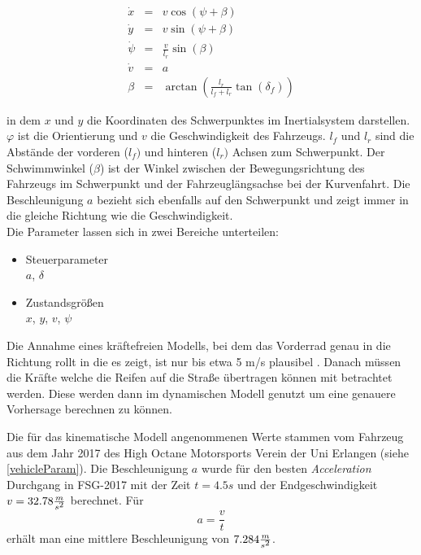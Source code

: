 \documentclass{like}
\begin{document}
\begin{eqnarray}
\label{kinDiscrete}
\dot{x}   &= &v  \cos(\psi + \beta)\\
\dot{y}   &= &v  \sin(\psi + \beta)\\
\dot{\psi} &= &\frac{v}{l_r} \sin(\beta) \\
\dot{v}    &= &a \\
\beta      &= &\arctan(\frac{l_r}{l_f + l_r} \tan(\delta_f))
\end{eqnarray}

in dem \(x\) und \(y\) die Koordinaten des Schwerpunktes im Inertialsystem darstellen. 
\(\varphi\) ist die Orientierung und \(v\) die Geschwindigkeit des Fahrzeugs. \(l_f\) und \(l_r\) sind die Abstände der vorderen (\(l_f)\) und hinteren (\(l_r)\) Achsen zum Schwerpunkt.
Der Schwimmwinkel (\(\beta\)) ist der Winkel  zwischen der Bewegungsrichtung des Fahrzeugs im Schwerpunkt und der Fahrzeuglängsachse bei der Kurvenfahrt. Die Beschleunigung \(a\) bezieht sich ebenfalls auf den Schwerpunkt und zeigt immer in die gleiche Richtung wie die Geschwindigkeit. \\
Die Parameter lassen sich in zwei Bereiche unterteilen:

\begin{itemize}
	\item Steuerparameter  \\
	\(a\), \(\delta\)
	\item Zustandsgrößen \\
	\(x\), \(y\), \(v\), \(\psi\)
	
\end{itemize}


Die Annahme eines kräftefreien Modells, bei dem das Vorderrad genau in die Richtung rollt in die es zeigt, ist nur bis etwa 5 m/s plausibel \cite{rajamani2011vehicle}. Danach müssen die Kräfte welche die Reifen auf die Straße übertragen können mit betrachtet werden. Diese werden dann im dynamischen Modell genutzt um eine genauere Vorhersage berechnen zu können.

Die für das kinematische Modell angenommenen Werte stammen vom Fahrzeug aus dem Jahr 2017 des High Octane Motorsports Verein der Uni Erlangen (siehe \ref{vehicleParam}). Die Beschleunigung \(a\) wurde für den besten \textit{Acceleration} Durchgang in FSG-2017 mit der Zeit $t = 4.5s$ und der Endgeschwindigkeit $v = 32.78 \frac{m}{s\textsuperscript{2}}$ berechnet. Für 
\begin{equation}
a = \frac{v}{t}  \label{long_acc_kin}
\end{equation}
erhält man eine mittlere Beschleunigung von $7.284 \frac{m}{s\textsuperscript{2}} $.
\end{document}
